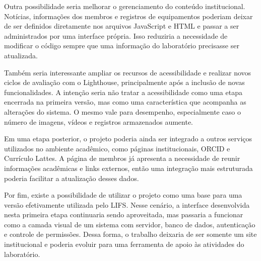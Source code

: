 Outra possibilidade seria melhorar o gerenciamento do conteúdo institucional. Notícias, informações dos membros e registros de equipamentos poderiam deixar de ser definidos diretamente nos arquivos JavaScript e HTML e passar a ser administrados por uma interface própria. Isso reduziria a necessidade de modificar o código sempre que uma informação do laboratório precisasse ser atualizada.

Também seria interessante ampliar os recursos de acessibilidade e realizar novos ciclos de avaliação com o Lighthouse, principalmente após a inclusão de novas funcionalidades. A intenção seria não tratar a acessibilidade como uma etapa encerrada na primeira versão, mas como uma característica que acompanha as alterações do sistema. O mesmo vale para desempenho, especialmente caso o número de imagens, vídeos e registros armazenados aumente.

Em uma etapa posterior, o projeto poderia ainda ser integrado a outros serviços utilizados no ambiente acadêmico, como páginas institucionais, ORCID e Currículo Lattes. A página de membros já apresenta a necessidade de reunir informações acadêmicas e links externos, então uma integração mais estruturada poderia facilitar a atualização desses dados.

Por fim, existe a possibilidade de utilizar o projeto como uma base para uma versão efetivamente utilizada pelo LIFS. Nesse cenário, a interface desenvolvida nesta primeira etapa continuaria sendo aproveitada, mas passaria a funcionar como a camada visual de um sistema com servidor, banco de dados, autenticação e controle de permissões. Dessa forma, o trabalho deixaria de ser somente um site institucional e poderia evoluir para uma ferramenta de apoio às atividades do laboratório.